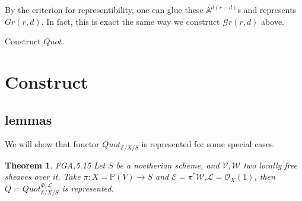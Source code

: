 \documentclass{article}
\newtheorem{thm}[defn]{Theorem}
\begin{document}
By the criterion for representibility, one can glue these $ \mathbb{A}^{d(r-d)} $s and represents $ Gr(r,d) $. In fact, this is exact the same way we construct $ \mathcal{G}r(r,d) $ above.

Construct $ Quot $.
\section{Construct}

\subsection{lemmas}	
We will show that functor $ Quot_{\mathcal{E}/X/S} $ is represented for some special cases.

\begin{thm}
	\emph{FGA,5.15} Let $ S $ be a noetherian scheme, and $ \mathcal{V,W} $ two locally free sheaves over it. Take $ \pi:X=\mathbb{P}(V)\to S $ and $ \mathcal{E}=\pi^*\mathcal{W} $,$ \mathcal{L}=\mathcal{O}_X(1) $, then $ Q=Quot^{\Phi ,\mathcal{L}}_{\mathcal{E}/X/S} $ is represented.
\end{thm}
\end{document}
